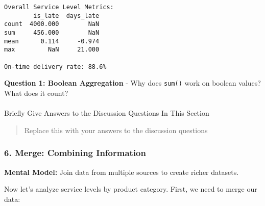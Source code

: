\documentclass[
  letterpaper,
  DIV=11,
  numbers=noendperiod]{scrartcl}
\makeatletter
\let\oldparagraph\paragraph
\renewcommand{\paragraph}{
    \@ifstar
      \xxxParagraphStar
      \xxxParagraphNoStar
  }
\newcommand{\xxxParagraphStar}[1]{\oldparagraph*{#1}\mbox{}}
\newcommand{\xxxParagraphNoStar}[1]{\oldparagraph{#1}\mbox{}}
\makeatother
\begin{document}
\begin{verbatim}
Overall Service Level Metrics:
        is_late  days_late
count  4000.000        NaN
sum     456.000        NaN
mean      0.114     -0.974
max         NaN     21.000

On-time delivery rate: 88.6%
\end{verbatim}

\begin{tcolorbox}[enhanced jigsaw, colbacktitle=quarto-callout-important-color!10!white, opacitybacktitle=0.6, colframe=quarto-callout-important-color-frame, coltitle=black, left=2mm, titlerule=0mm, title=\textcolor{quarto-callout-important-color}{\faExclamation}\hspace{0.5em}{🤔 Discussion Questions: Aggregate Mental Model}, bottomtitle=1mm, opacityback=0, arc=.35mm, rightrule=.15mm, colback=white, breakable, bottomrule=.15mm, toprule=.15mm, toptitle=1mm, leftrule=.75mm]

\textbf{Question 1: Boolean Aggregation} - Why does \texttt{sum()} work
on boolean values? What does it count?

\end{tcolorbox}

\paragraph{Briefly Give Answers to the Discussion Questions In This
Section}\label{briefly-give-answers-to-the-discussion-questions-in-this-section-4}

\begin{quote}
Replace this with your answers to the discussion questions
\end{quote}

\subsubsection{6. Merge: Combining
Information}\label{merge-combining-information}

\textbf{Mental Model:} Join data from multiple sources to create richer
datasets.

Now let's analyze service levels by product category. First, we need to
merge our data:
\end{document}
